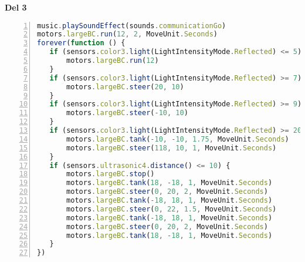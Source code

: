 \documentclass{article}
\begin{document}
{\setlength{\parindent}{0cm}
\textbf{Del 3}\newline
}

\begin{lstlisting}[language=JavaScript, numbers=left]
music.playSoundEffect(sounds.communicationGo)
motors.largeBC.run(12, 2, MoveUnit.Seconds)
forever(function () {
   if (sensors.color3.light(LightIntensityMode.Reflected) <= 5) {
       motors.largeBC.run(12)
   }
   if (sensors.color3.light(LightIntensityMode.Reflected) >= 7) {
       motors.largeBC.steer(20, 10)
   }
   if (sensors.color3.light(LightIntensityMode.Reflected) >= 9) {
       motors.largeBC.steer(-10, 10)
   }
   if (sensors.color3.light(LightIntensityMode.Reflected) >= 20) {
       motors.largeBC.tank(-10, -10, 1.75, MoveUnit.Seconds)
       motors.largeBC.steer(118, 10, 1, MoveUnit.Seconds)
   }
   if (sensors.ultrasonic4.distance() <= 10) {
       motors.largeBC.stop()
       motors.largeBC.tank(18, -18, 1, MoveUnit.Seconds)
       motors.largeBC.steer(0, 20, 2, MoveUnit.Seconds)
       motors.largeBC.tank(-18, 18, 1, MoveUnit.Seconds)
       motors.largeBC.steer(0, 22, 1.5, MoveUnit.Seconds)
       motors.largeBC.tank(-18, 18, 1, MoveUnit.Seconds)
       motors.largeBC.steer(0, 20, 2, MoveUnit.Seconds)
       motors.largeBC.tank(18, -18, 1, MoveUnit.Seconds)
   }
})

\end{lstlisting}
\end{document}
